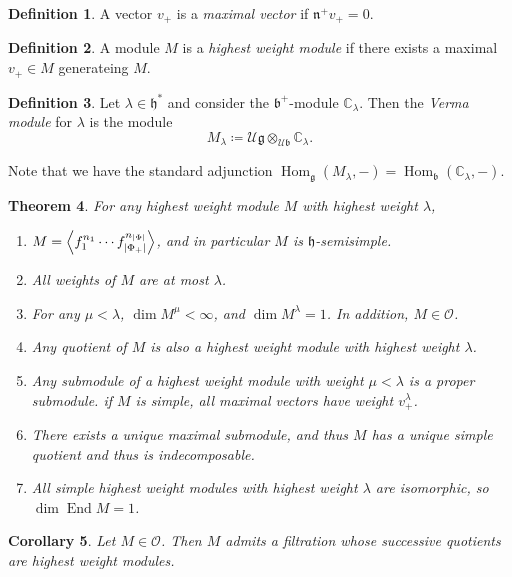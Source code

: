 \documentclass[leqno, openany]{memoir}
\newtheorem{thm}{Theorem}[section]
\newtheorem{cor}[thm]{Corollary}
\theoremstyle{definition}
\newtheorem{defn}[thm]{Definition}
\theoremstyle{remark}
\theoremstyle{plain}
\theoremstyle{definition}
\theoremstyle{remark}
\newcommand{\C}{\mathbb{C}}
\newcommand{\U}{\mathcal{U}}
\newcommand{\g}{\mathfrak{g}}
\newcommand{\h}{\mathfrak{h}}
\newcommand{\n}{\mathfrak{n}}
\renewcommand{\b}{\mathfrak{b}}
\newcommand{\mc}[1]{\mathcal{#1}}
\DeclareMathOperator{\Hom}{Hom}
\DeclareMathOperator{\End}{End}
\begin{document}
\begin{defn}
    A vector $v_+$ is a \textit{maximal vector} if $\n^+ v_+ = 0$.
\end{defn}

\begin{defn}
    A module $M$ is a \textit{highest weight module} if there exists a maximal $v_+ \in M$ generateing $M$.
\end{defn}

\begin{defn}
    Let $\lambda \in \h^*$ and consider the $\b^+$-module $\C_{\lambda}$. Then the \textit{Verma module} for $\lambda$ is the module
    \[ M_{\lambda} \coloneqq \U \g \otimes_{\U \b} \C_{\lambda}. \]
\end{defn}

Note that we have the standard adjunction $\Hom_{\g}(M_{\lambda}, -) = \Hom_{\b}(\C_{\lambda}, -)$.

\begin{thm}
    For any highest weight module $M$ with highest weight $\lambda$,
    \begin{enumerate}
        \item $M = \ev{ f_1^{n_1} \cdots f_{\abs{\Phi_+}}^{n_{\abs{\Phi}}}}$, and in particular $M$ is $\h$-semisimple.
        \item All weights of $M$ are at most $\lambda$.
        \item For any $\mu < \lambda$, $\dim M^{\mu} < \infty$, and $\dim M^{\lambda} = 1$. In addition, $M \in \mc{O}$.
        \item Any quotient of $M$ is also a highest weight module with highest weight $\lambda$.
        \item Any submodule of a highest weight module with weight $\mu < \lambda$ is a proper submodule. if $M$ is simple, all maximal vectors have weight $v_+^{\lambda}$.
        \item There exists a unique maximal submodule, and thus $M$ has a unique simple quotient and thus is indecomposable.
        \item All simple highest weight modules with highest weight $\lambda$ are isomorphic, so $\dim \End M = 1$.
    \end{enumerate}
\end{thm}

\begin{cor}
    Let $M \in \mc{O}$. Then $M$ admits a filtration whose successive quotients are highest weight modules.
\end{cor}
\end{document}
